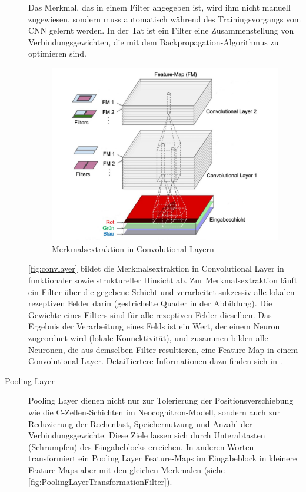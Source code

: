 \begin{description}
	Das Merkmal, das in einem Filter angegeben ist, wird ihm nicht manuell zugewiesen, sondern muss automatisch während des Trainingsvorgangs vom CNN gelernt werden. In der Tat ist ein Filter eine Zusammenstellung von Verbindungsgewichten, die mit dem Backpropagation-Algorithmus zu optimieren sind.
	\begin{figure}[!h]
	\centering
	\includegraphics[width=\linewidth]{images/convolutionalLayer}
	\caption{Merkmalsextraktion in Convolutional Layern  \protect\cite{convlayer}}
	\label{fig:convlayer}
	\end{figure}

	\autoref{fig:convlayer} bildet die Merkmalsextraktion in Convolutional Layer in funktionaler sowie struktureller Hinsicht ab. Zur Merkmalsextraktion läuft ein Filter über die gegebene Schicht und verarbeitet sukzessiv alle lokalen rezeptiven Felder darin (gestrichelte Quader in der Abbildung). Die Gewichte eines Filters sind für alle rezeptiven Felder dieselben. Das Ergebnis der Verarbeitung eines Felds ist ein Wert, der einem Neuron zugeordnet wird (lokale Konnektivität), und zusammen bilden alle Neuronen, die aus demselben Filter resultieren, eine Feature-Map in einem Convolutional Layer. Detailliertere Informationen dazu finden sich in \cite{10.5555/3378999}.

	\item[Pooling Layer] Pooling Layer dienen nicht nur zur Tolerierung der Positionsverschiebung wie die C-Zellen-Schichten im Neocognitron-Modell, sondern auch zur Reduzierung der Rechenlast, Speichernutzung und Anzahl der Verbindungsgewichte. Diese Ziele lassen sich durch Unterabtasten (Schrumpfen) des Eingabeblocks erreichen. In anderen Worten transformiert ein Pooling Layer Feature-Maps im Eingabeblock in kleinere Feature-Maps aber mit den gleichen Merkmalen (siehe \autoref{fig:PoolingLayerTransformationFilter}).
	

\end{description}
